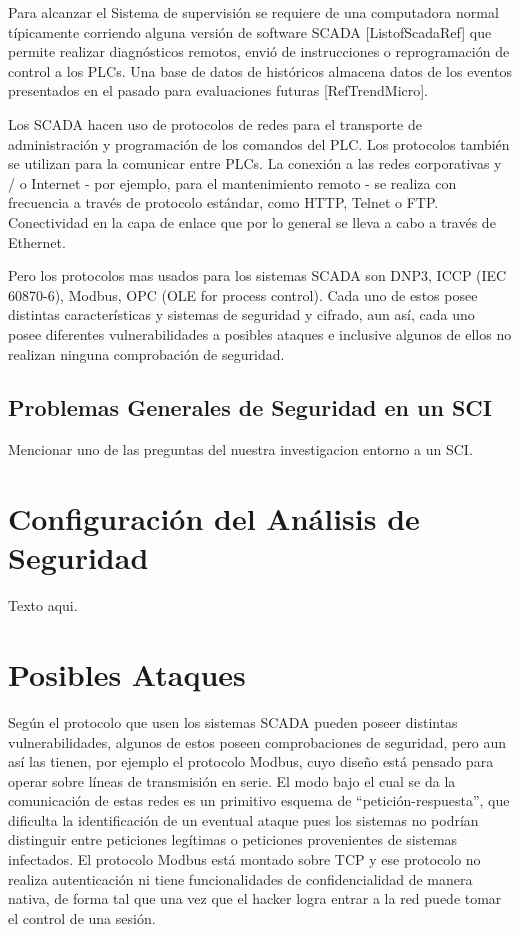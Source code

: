 \documentclass[jou]{apa6}   %
\begin{document}
Para alcanzar el Sistema de supervisión se requiere de una computadora normal típicamente corriendo alguna versión de software SCADA  [ListofScadaRef] que permite realizar diagnósticos remotos, envió de instrucciones o reprogramación de control a los PLCs. Una base de datos de históricos almacena datos de los eventos presentados  en el pasado para evaluaciones futuras [RefTrendMicro]. 

Los SCADA hacen uso de protocolos de redes para el transporte de administración y  programación de los comandos del PLC. Los protocolos también se utilizan para la comunicar  entre PLCs. La conexión a las redes corporativas y / o Internet - por ejemplo, para el mantenimiento remoto - se realiza con frecuencia a través de protocolo estándar, como HTTP, Telnet o FTP. Conectividad en la capa de enlace que por lo general se lleva a cabo a través de Ethernet.

Pero los protocolos mas usados para los sistemas SCADA son DNP3, ICCP (IEC 60870-6), Modbus, OPC (OLE for process control). Cada uno de estos posee distintas características y sistemas de seguridad y cifrado, aun así, cada uno posee diferentes vulnerabilidades a posibles ataques e inclusive algunos de ellos no realizan ninguna comprobación de seguridad.

\subsection{Problemas Generales de Seguridad en un SCI }
Mencionar uno de las preguntas del nuestra investigacion entorno a un SCI.

\section{Configuración del Análisis de Seguridad}
Texto aqui.
\section{Posibles Ataques }
Según el protocolo que usen los sistemas SCADA pueden poseer distintas vulnerabilidades, algunos de estos poseen comprobaciones de seguridad, pero aun así las tienen, por ejemplo el protocolo Modbus, cuyo diseño está pensado para operar sobre líneas de transmisión en serie. El modo bajo el cual se da la comunicación de estas redes es un primitivo esquema de “petición-respuesta”, que dificulta la identificación de un eventual ataque pues los sistemas no podrían distinguir entre peticiones legítimas o peticiones provenientes de sistemas infectados. El protocolo Modbus está montado sobre TCP y ese protocolo no realiza autenticación ni tiene funcionalidades de confidencialidad de manera nativa, de forma tal que una vez que el hacker logra entrar a la red puede tomar el control de una sesión.
\end{document}
